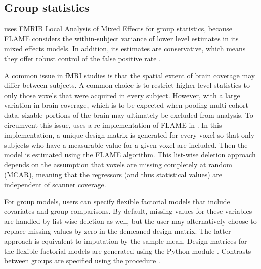\subsection{Group statistics}\label{sec:statistics}

 uses  FMRIB Local Analysis of Mixed Effects \parencite[FLAME,][]{woolrich2004} for group statistics, because FLAME considers the within-subject variance of lower level estimates in its mixed effects models. In addition, its estimates are conservative, which means they offer robust control of the false positive rate \parencite{eklund2016}.

A common issue in fMRI studies is that the spatial extent of brain coverage may differ between subjects. A common choice is to restrict higher-level statistics to only those voxels that were acquired in every subject. However, with a large variation in brain coverage, which is to be expected when pooling multi-cohort data, sizable portions of the brain may ultimately be excluded from analysis. To circumvent this issue,  uses a re-implementation of FLAME in  \parencite{harris2020}. In this implementation, a unique design matrix is generated for every voxel so that only subjects who have a measurable value for a given voxel are included. Then the model is estimated using the FLAME algorithm. This list-wise deletion approach depends on the assumption that voxels are missing completely at random (MCAR), meaning that the regressors (and thus statistical values) are independent of scanner coverage.

For group models, users can specify flexible factorial models that include covariates and group comparisons. By default, missing values for these variables are handled by list-wise deletion as well, but the user may alternatively choose to replace missing values by zero in the demeaned design matrix. The latter approach is equivalent to imputation by the sample mean. Design matrices for the flexible factorial models are generated using the Python module  \parencite{smith2018}. Contrasts between groups are specified using the  procedure \parencite{lenth2016}.
